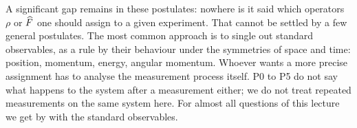 A significant gap remains in these postulates: nowhere is it said which operators $\rho$ or $\widehat{F}$ one should assign to a given experiment. That cannot be settled by a few general postulates. The most common approach is to single out standard observables, as a rule by their behaviour under the symmetries of space and time: position, momentum, energy, angular momentum. Whoever wants a more precise assignment has to analyse the measurement process itself. P0 to P5 do not say what happens to the system after a measurement either; we do not treat repeated measurements on the same system here. For almost all questions of this lecture we get by with the standard observables.
